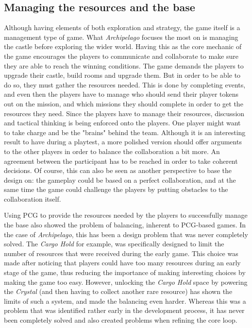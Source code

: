 \subsection{Managing the resources and the base}
\label{sec:management}
Although having elements of both exploration and strategy, the game itself is a management type of game. What \textit{Archipelago} focuses the most on is managing the castle before exploring the wider world. Having this as the core mechanic of the game encourages the players to communicate and collaborate to make sure they are able to reach the winning conditions. The game demands the players to upgrade their castle, build rooms and upgrade them. But in order to be able to do so, they must gather the resources needed. This is done by completing events, and even then the players have to manage who should send their player tokens out on the mission, and which missions they should complete in order to get the resources they need. Since the players have to manage their resources, discussion and tactical thinking is being enforced onto the players. One player might want to take charge and be the "brains" behind the team. Although it is an interesting result to have during a playtest, a more polished version should offer arguments to the other players in order to balance the collaboration a bit more. An agreement between the participant has to be reached in order to take coherent decisions. Of course, this can also be seen as another perspective to base the design on: the gameplay could be based on a perfect collaboration, and at the same time the game could challenge the players by putting obstacles to the collaboration itself. 

Using PCG to provide the resources needed by the players to successfully manage the base also showed the problem of balancing, inherent to PCG-based games. In the case of \textit{Archipelago}, this has been a design problem that was never completely solved. The \textit{Cargo Hold} for example, was specifically designed to limit the number of resources that were received during the early game. This choice was made after noticing that players could have too many resources during an early stage of the game, thus reducing the importance of making interesting choices by making the game too easy. However, unlocking the \textit{Cargo Hold} space by powering the \textit{Crystal} (and then having to collect another rare resource) has shown the limits of such a system, and made the balancing even harder. Whereas this was a problem that was identified rather early in the development process, it has never been completely solved and also created problems when refining the core loop.

